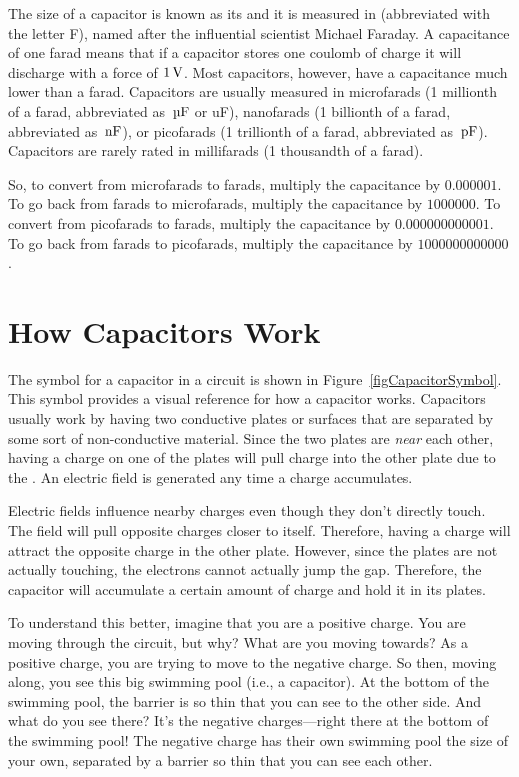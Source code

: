 The size of a capacitor is known as its  and it is measured in  (abbreviated with the letter F), named after the influential scientist Michael Faraday.
A capacitance of one farad means that if a capacitor stores one coulomb of charge it will discharge with a force of $1\,\si{\volt}$.
Most capacitors, however, have a capacitance much lower than a farad.
Capacitors are usually measured in microfarads (1 millionth of a farad, abbreviated as $\,\si{\micro\farad}$ or uF), nanofarads (1 billionth of a farad, abbreviated as $\,\si{\nano\farad}$), or picofarads (1 trillionth of a farad, abbreviated as $\mypf$).  
Capacitors are rarely rated in millifarads (1 thousandth of a farad).

So, to convert from microfarads to farads, multiply the capacitance by $0.000001$.
To go back from farads to microfarads, multiply the capacitance by $1000000$.
To convert from picofarads to farads, multiply the capacitance by $0.000000000001$.
To go back from farads to picofarads, multiply the capacitance by $1000000000000$.

\section{How Capacitors Work}


The symbol for a capacitor in a circuit is shown in Figure~\ref{figCapacitorSymbol}.
This symbol provides a visual reference for how a capacitor works.
Capacitors usually work by having two conductive plates or surfaces that are separated by some sort of non-conductive material.
Since the two plates are \emph{near} each other, having a charge on one of the plates will pull charge into the other plate due to the .
An electric field is generated any time a charge accumulates.

Electric fields influence nearby charges even though they don't directly touch.
The field will pull opposite charges closer to itself.
Therefore, having a charge will attract the opposite charge in the other plate.
However, since the plates are not actually touching, the electrons cannot actually jump the gap.
Therefore, the capacitor will accumulate a certain amount of charge and hold it in its plates.

To understand this better, imagine that you are a positive charge.
You are moving through the circuit, but why?  What are you moving towards?
As a positive charge, you are trying to move to the negative charge.
So then, moving along, you see this big swimming pool (i.e., a capacitor).
At the bottom of the swimming pool, the barrier is so thin that you can see to the other side.
And what do you see there?  
It's the negative charges---right there at the bottom of the swimming pool!
The negative charge has their own swimming pool the size of your own, separated by a barrier so thin that you can see each other.

